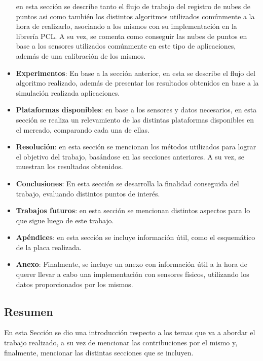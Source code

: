 \begin{itemize}
        \fi
    \fi 
    en esta sección se describe tanto el flujo de trabajo del registro de nubes de puntos asi como también los distintos algoritmos utilizados comúnmente a la hora de realizarlo, asociando a los mismos con su implementación en la librería PCL. A su vez, se comenta como conseguir las nubes de puntos en base a los sensores utilizados comúnmente en este tipo de
    \ifimagenes
    aplicaciones, además de una calibración de los mismos.
    \item \textbf{Experimentos}: En base a la sección anterior, en esta se describe el flujo del algoritmo realizado, además de presentar los resultados obtenidos en base a la simulación realizada
    \else
    aplicaciones.
    \item \textbf{Plataformas disponibles}: en base a los sensores y datos necesarios, en esta sección se realiza un relevamiento de las distintas plataformas disponibles en el mercado, comparando cada una de ellas.
    \item \textbf{Resolución}: en esta sección se mencionan los métodos utilizados para lograr el objetivo del trabajo, basándose en las secciones anteriores. A su vez, se muestran los resultados obtenidos.
    \fi
    \item \textbf{Conclusiones}: En esta sección se desarrolla la finalidad conseguida del trabajo, evaluando distintos puntos de interés.
    \ifimagenes
    \item \textbf{Trabajos futuros}: en esta sección se mencionan distintos aspectos para lo que sigue luego de este trabajo.
    \else
    \item \textbf{Apéndices}: en esta sección se incluye información útil, como el esquemático de la placa realizada.
        \ifimagenespaper
        \else
    \item \textbf{Anexo}: Finalmente, se incluye un anexo con información útil a la hora de querer llevar a cabo una implementación con sensores físicos, utilizando los datos proporcionados por los mismos.
        \fi
    \fi
\end{itemize}

\subsection{Resumen}
En esta Sección se dio una introducción respecto a los temas que va a abordar el trabajo realizado, a su vez de mencionar las contribuciones por el mismo y, finalmente, mencionar las distintas secciones que se incluyen.